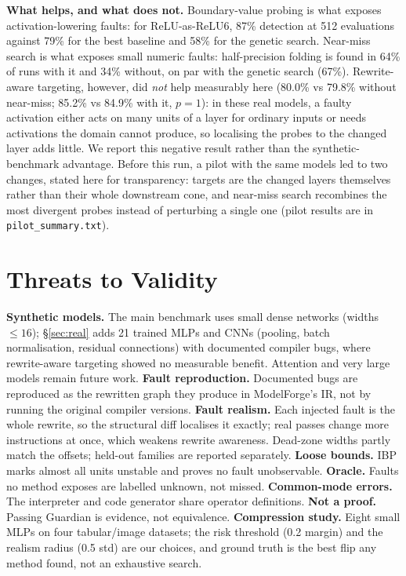 \documentclass[conference]{IEEEtran}
\begin{document}
\textbf{What helps, and what does not.} Boundary-value probing is what exposes activation-lowering faults: for ReLU-as-ReLU6, 87\% detection at 512 evaluations against 79\% for the best baseline and 58\% for the genetic search. Near-miss search is what exposes small numeric faults: half-precision folding is found in 64\% of runs with it and 34\% without, on par with the genetic search (67\%). Rewrite-aware targeting, however, did \emph{not} help measurably here (80.0\% vs 79.8\% without near-miss; 85.2\% vs 84.9\% with it, $p=1$): in these real models, a faulty activation either acts on many units of a layer for ordinary inputs or needs activations the domain cannot produce, so localising the probes to the changed layer adds little. We report this negative result rather than the synthetic-benchmark advantage. Before this run, a pilot with the same models led to two changes, stated here for transparency: targets are the changed layers themselves rather than their whole downstream cone, and near-miss search recombines the most divergent probes instead of perturbing a single one (pilot results are in \texttt{pilot\_summary.txt}).

\section{Threats to Validity}
\textbf{Synthetic models.} The main benchmark uses small dense networks (widths $\le16$); \S\ref{sec:real} adds 21 trained MLPs and CNNs (pooling, batch normalisation, residual connections) with documented compiler bugs, where rewrite-aware targeting showed no measurable benefit. Attention and very large models remain future work. \textbf{Fault reproduction.} Documented bugs are reproduced as the rewritten graph they produce in ModelForge's IR, not by running the original compiler versions. \textbf{Fault realism.} Each injected fault is the whole rewrite, so the structural diff localises it exactly; real passes change more instructions at once, which weakens rewrite awareness. Dead-zone widths partly match the offsets; held-out families are reported separately. \textbf{Loose bounds.} IBP marks almost all units unstable and proves no fault unobservable. \textbf{Oracle.} Faults no method exposes are labelled unknown, not missed. \textbf{Common-mode errors.} The interpreter and code generator share operator definitions. \textbf{Not a proof.} Passing Guardian is evidence, not equivalence. \textbf{Compression study.} Eight small MLPs on four tabular/image datasets; the risk threshold (0.2 margin) and the realism radius (0.5 std) are our choices, and ground truth is the best flip any method found, not an exhaustive search.
\end{document}
